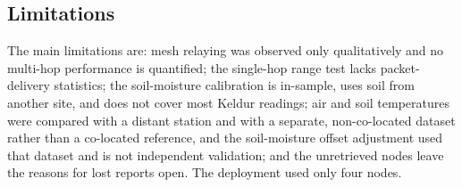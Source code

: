 \subsection{Limitations}
The main limitations are: mesh relaying was observed only qualitatively and no multi-hop performance is quantified; the single-hop range test lacks packet-delivery statistics; the soil-moisture calibration is in-sample, uses soil from another site, and does not cover most Keldur readings; air and soil temperatures were compared with a distant station and with a separate, non-co-located dataset rather than a co-located reference, and the soil-moisture offset adjustment used that dataset and is not independent validation; and the unretrieved nodes leave the reasons for lost reports open. The deployment used only four nodes.
